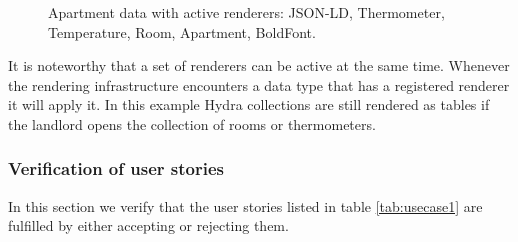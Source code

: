 \begin{figure}[!htb]
  \caption{Apartment data with active renderers: JSON-LD, Thermometer, Temperature, Room, Apartment, BoldFont.}
  \label{fig:apartmentrenderer}
\end{figure}

It is noteworthy that a set of renderers can be active at the same time. Whenever the rendering infrastructure encounters a data type that has a registered renderer it will apply it. In this example Hydra collections are still rendered as tables if the landlord opens the collection of rooms or thermometers.

\subsubsection{Verification of user stories}
In this section we verify that the user stories listed in table \ref{tab:usecase1} are fulfilled by either accepting or rejecting them.

